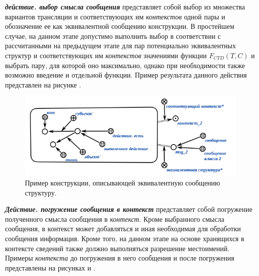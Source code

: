 \textit{\textbf{действие. выбор смысла сообщения}} представляет собой выбор из множества вариантов трансляции и соответствующих им \textit{контекстов} одной пары и обозначение ее как эквивалентной сообщению конструкции.
В простейшем случае, на данном этапе допустимо выполнить выбор в соответствии с рассчитанными на предыдущем этапе для пар потенциально эквивалентных структур и соответствующих им \textit{контекстов} значениями функции \textit{$F_{CTD}(T, C)$} и выбрать пару, для которой оно максимально, однако при необходимости также возможно введение и отдельной функции.
Пример результата данного действия представлен на рисунке \textit{}.

\begin{figure}[h]
    \centering
    \includegraphics[scale=0.8]{images/part4/chapter_nl_interfaces/message_equivalent_structure}
    \caption{Пример конструкции, описывающей эквивалентную сообщению структуру.}
    \label{fig:message_equivalent_structure}
\end{figure}

\textit{\textbf{Действие. погружение сообщения в контекст}} представляет собой погружение полученного смысла сообщения в \textit{контекст}.
Кроме выбранного смысла сообщения, в контекст может добавляться и иная необходимая для обработки сообщения информация.
Кроме того, на данном этапе на основе хранящихся в контексте сведений также должно выполняться разрешение местоимений.
Примеры \textit{контекста} до погружения в него сообщения и после погружения представлены на рисунках \textit{} и \textit{}.

